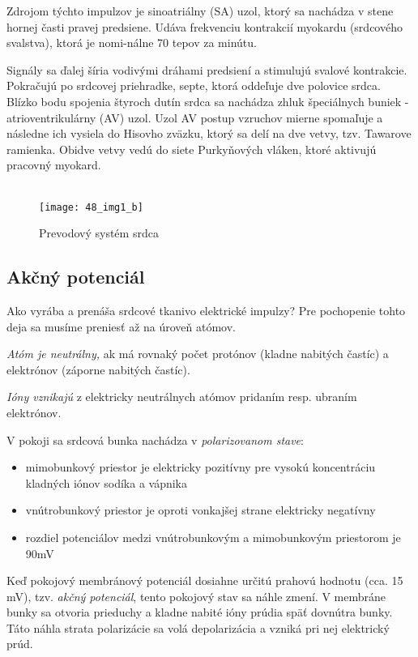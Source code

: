 \documentclass[titlepage,12pt]{article}
\begin{document}
Zdrojom týchto impulzov je sinoatriálny (SA) uzol, ktorý sa nachádza v stene hornej časti pravej predsiene. Udáva frekvenciu kontrakcií myokardu (srdcového svalstva), ktorá je nomi-nálne 70 tepov za minútu.

Signály sa ďalej šíria vodivými dráhami predsiení a stimulujú svalové kontrakcie. Pokračujú po srdcovej priehradke, septe, ktorá oddeľuje dve polovice srdca. Blízko bodu spojenia štyroch dutín srdca sa nachádza zhluk špeciálnych buniek - atrioventrikulárny (AV) uzol. Uzol AV postup vzruchov mierne spomaľuje a následne ich vysiela do Hisovho zväzku, ktorý sa delí na dve vetvy, tzv. Tawarove ramienka. Obidve vetvy vedú do siete Purkyňových vláken, ktoré aktivujú pracovný myokard.
\\
\\

\begin{figure}[!ht]
\begin{center}
\texttt{[image: 48\_img1\_b]}
\caption{Prevodový systém srdca}
\end{center}
\end{figure}

\newpage
\subsection{Akčný potenciál}
Ako vyrába a prenáša srdcové tkanivo elektrické impulzy? Pre pochopenie tohto deja sa musíme preniesť až na úroveň atómov.

\emph{Atóm je neutrálny,} ak má rovnaký počet protónov (kladne nabitých častíc) a elektrónov (záporne nabitých častíc). 

\emph{Ióny vznikajú} z elektricky neutrálnych atómov pridaním resp. ubraním elektrónov. 

V pokoji sa srdcová bunka nachádza v \emph{polarizovanom stave}:
\begin{itemize}
	\item mimobunkový priestor je elektricky pozitívny pre vysokú koncentráciu kladných iónov sodíka a vápnika
	\item vnútrobunkový priestor je oproti vonkajšej strane elektricky negatívny
	\item rozdiel potenciálov medzi vnútrobunkovým a mimobunkovým priestorom je 90mV
\end{itemize}

Keď pokojový membránový potenciál dosiahne určitú prahovú hodnotu (cca. 15 mV), tzv. \emph{akčný potenciál}, tento pokojový stav sa náhle zmení. V membráne bunky sa otvoria prieduchy a kladne nabité ióny prúdia späť dovnútra bunky. Táto náhla strata polarizácie sa volá depolarizácia a vzniká pri nej elektrický prúd.
\end{document}
